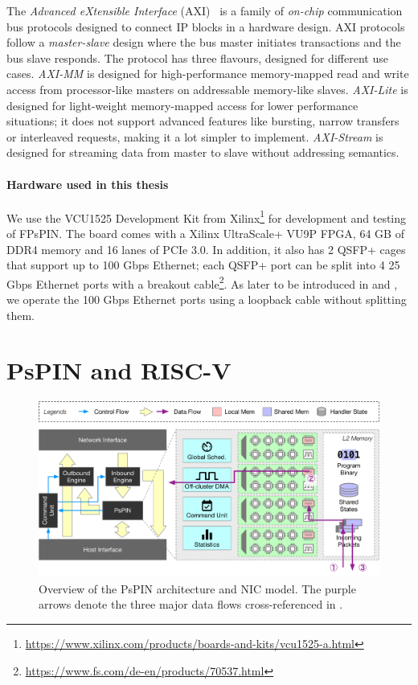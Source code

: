 The \emph{Advanced eXtensible Interface} (AXI)~\cite{arm_limited_amba_2003, arm_limited_amba_2010} is a family of \emph{on-chip} communication bus protocols designed to connect IP blocks in a hardware design.  AXI protocols follow a \emph{master-slave} design where the bus master initiates transactions and the bus slave responds.  The protocol has three flavours, designed for different use cases.  \emph{AXI-MM} is designed for high-performance memory-mapped read and write access from processor-like masters on addressable memory-like slaves.  \emph{AXI-Lite} is designed for light-weight memory-mapped access for lower performance situations; it does not support advanced features like bursting, narrow transfers or interleaved requests, making it a lot simpler to implement.  \emph{AXI-Stream} is designed for streaming data from master to slave without addressing semantics.

\paragraph{Hardware used in this thesis} We use the VCU1525 Development Kit from Xilinx\footnote{\url{https://www.xilinx.com/products/boards-and-kits/vcu1525-a.html}} for development and testing of FPsPIN.  The board comes with a Xilinx UltraScale+ VU9P FPGA, 64 GB of DDR4 memory and 16 lanes of PCIe 3.0.  In addition, it also has 2 QSFP+ cages that support up to 100 Gbps Ethernet; each QSFP+ port can be split into 4 25 Gbps Ethernet ports with a breakout cable\footnote{\url{https://www.fs.com/de-en/products/70537.html}}.  As later to be introduced in  and , we operate the 100 Gbps Ethernet ports using a loopback cable without splitting them.

\section{PsPIN and RISC-V} \label{sec:background-pspin}

\begin{figure}[tp]
    \centering
    \includegraphics[width=\textwidth]{thesis/figures/pspin-arch.pdf}
    \caption{Overview of the PsPIN architecture and NIC model.  The purple arrows denote the three major data flows cross-referenced in .} \label{fig:pspin-arch}
\end{figure}

